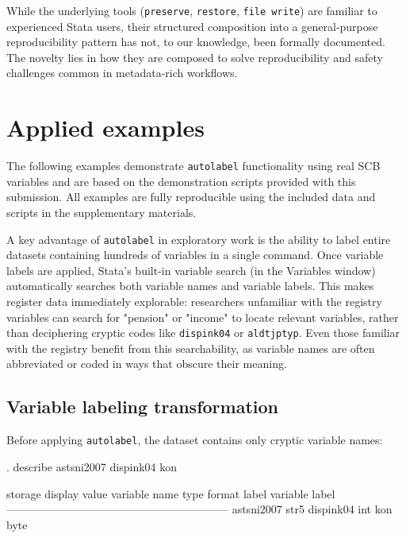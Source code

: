 While the underlying tools (\texttt{preserve}, \texttt{restore}, \texttt{file write}) are familiar to experienced Stata users, their structured composition into a general-purpose reproducibility pattern has not, to our knowledge, been formally documented. The novelty lies in how they are composed to solve reproducibility and safety challenges common in metadata-rich workflows.



\section{Applied examples}

The following examples demonstrate \texttt{autolabel} functionality using real SCB variables and are based on the demonstration scripts provided with this submission. All examples are fully reproducible using the included data and scripts in the supplementary materials.

A key advantage of \texttt{autolabel} in exploratory work is the ability to label entire datasets containing hundreds of variables in a single command. Once variable labels are applied, Stata's built-in variable search (in the Variables window) automatically searches both variable names and variable labels. This makes register data immediately explorable: researchers unfamiliar with the registry variables can search for "pension" or "income" to locate relevant variables, rather than deciphering cryptic codes like \texttt{dispink04} or \texttt{aldtjptyp}. Even those familiar with the registry benefit from this searchability, as variable names are often abbreviated or coded in ways that obscure their meaning.

\subsection{Variable labeling transformation}

Before applying \texttt{autolabel}, the dataset contains only cryptic variable names:

\begin{stlog}
. describe astsni2007 dispink04 kon

              storage   display    value
variable name   type    format     label      variable label
------------------------------------------------------------
astsni2007      str5    %
dispink04       int     %
kon             byte    %
\end{stlog}


